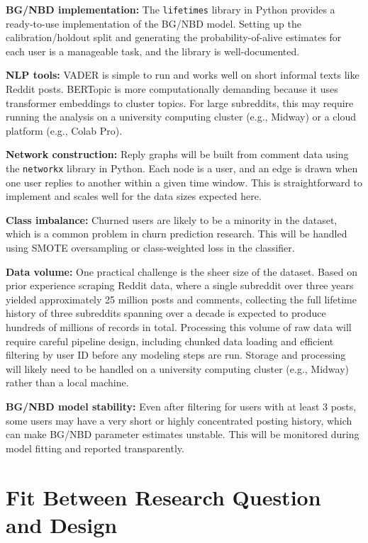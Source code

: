 \documentclass[12pt]{article}
\begin{document}
\textbf{BG/NBD implementation:} The \texttt{lifetimes} library in Python provides a ready-to-use implementation of the BG/NBD model. Setting up the calibration/holdout split and generating the probability-of-alive estimates for each user is a manageable task, and the library is well-documented.

\textbf{NLP tools:} VADER is simple to run and works well on short informal texts like Reddit posts. BERTopic is more computationally demanding because it uses transformer embeddings to cluster topics. For large subreddits, this may require running the analysis on a university computing cluster (e.g., Midway) or a cloud platform (e.g., Colab Pro).

\textbf{Network construction:} Reply graphs will be built from comment data using the \texttt{networkx} library in Python. Each node is a user, and an edge is drawn when one user replies to another within a given time window. This is straightforward to implement and scales well for the data sizes expected here.

\textbf{Class imbalance:} Churned users are likely to be a minority in the dataset, which is a common problem in churn prediction research. This will be handled using SMOTE oversampling or class-weighted loss in the classifier.

\textbf{Data volume:} One practical challenge is the sheer size of the dataset. Based on prior experience scraping Reddit data, where a single subreddit over three years yielded approximately 25 million posts and comments, collecting the full lifetime history of three subreddits spanning over a decade is expected to produce hundreds of millions of records in total. Processing this volume of raw data will require careful pipeline design, including chunked data loading and efficient filtering by user ID before any modeling steps are run. Storage and processing will likely need to be handled on a university computing cluster (e.g., Midway) rather than a local machine.

\textbf{BG/NBD model stability:} Even after filtering for users with at least 3 posts, some users may have a very short or highly concentrated posting history, which can make BG/NBD parameter estimates unstable. This will be monitored during model fitting and reported transparently.

\section*{Fit Between Research Question and Design}
\end{document}
